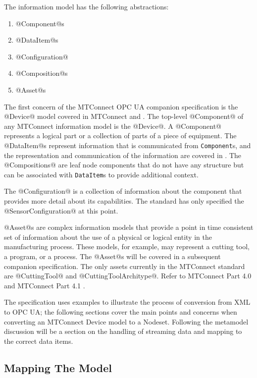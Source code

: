 The \mtconnect information model has the following abstractions:

\begin{enumerate}
\item @Component@s
\item @DataItem@s
\item @Configuration@
\item @Composition@s
\item @Asset@s
\end{enumerate}

The first concern of the MTConnect OPC UA companion specification is the @Device@ model covered in MTConnect \cite{MTCPart2} and \cite{MTCPart3}. The top-level @Component@ of any MTConnect information model is the @Device@. A @Component@ represents a logical part or a collection of parts of a piece of equipment. The @DataItem@s represent information that is communicated from \texttt{Component}s, and the representation and communication of the information are covered in \cite{MTCPart3}. The @Compositions@ are leaf node components that do not have any structure but can be associated with \texttt{DataItem}s to provide additional context. 

The @Configuration@ is a collection of information about the component that provides more detail about its capabilities. The standard has only specified the @SensorConfiguration@ at this point.

@Asset@s are complex information models that provide a point in time consistent set of information about the use of a physical or logical entity in the manufacturing process. These models, for example, may represent a cutting tool, a program, or a process. The @Asset@s will be covered in a subsequent companion specification. The only assets currently in the MTConnect standard are @CuttingTool@ and @CuttingToolArchitype@. Refer to MTConnect Part 4.0 \cite{MTCPart40} and MTConnect Part 4.1 \cite{MTCPart41}.

The specification uses examples to illustrate the process of conversion from XML to OPC UA; the following sections cover the main points and concerns when converting an MTConnect Device model to a Nodeset. Following the metamodel discussion will be a section on the handling of streaming data and mapping to the correct data items. 

\subsection{Mapping The Model}

